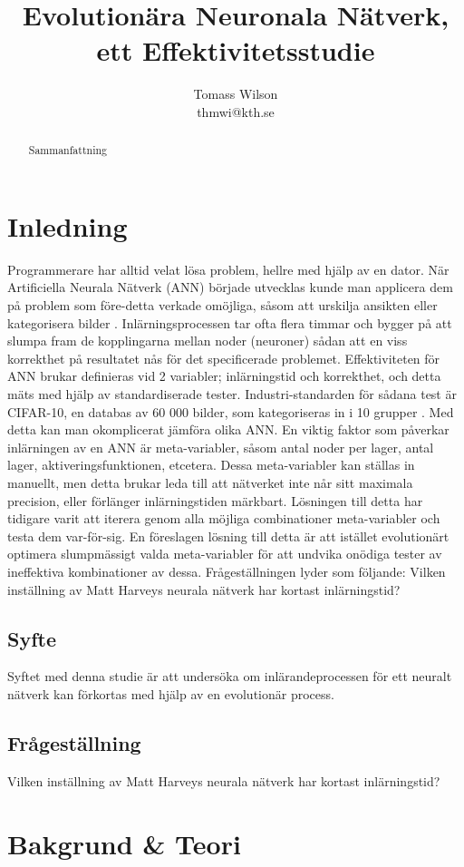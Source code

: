 \documentclass[a4paper, 11pt, twocolumn]{article}
\title{Evolutionära Neuronala Nätverk, ett Effektivitetsstudie}
\author{Tomass Wilson\\thmwi@kth.se}
\begin{document}
  \maketitle

  \begin{abstract}
    Sammanfattning
  \end{abstract}

  \tableofcontents

  \section{Inledning}
    Programmerare har alltid velat lösa problem, hellre med hjälp av en dator. När Artificiella Neurala Nätverk (ANN) började utvecklas kunde man applicera dem på problem som före-detta verkade omöjliga, såsom att urskilja ansikten eller kategorisera bilder \parencite{hopfield1988artificial}. Inlärningsprocessen tar ofta flera timmar och bygger på att slumpa fram de kopplingarna mellan noder (neuroner) sådan att en viss korrekthet på resultatet nås för det specificerade problemet. Effektiviteten för ANN brukar definieras vid 2 variabler; inlärningstid och korrekthet, och detta mäts med hjälp av standardiserade tester. Industri-standarden för sådana test är CIFAR-10, en databas av 60 000 bilder, som kategoriseras in i 10 grupper \parencite{krizhevsky2014cifar}. Med detta kan man okomplicerat jämföra olika ANN. En viktig faktor som påverkar inlärningen av en ANN är meta-variabler, såsom antal noder per lager, antal lager, aktiveringsfunktionen, etcetera. Dessa meta-variabler kan ställas in manuellt, men detta brukar leda till att nätverket inte når sitt maximala precision, eller förlänger inlärningstiden märkbart. Lösningen till detta har tidigare varit att iterera genom alla möjliga combinationer meta-variabler och testa dem var-för-sig. En föreslagen lösning till detta är att istället evolutionärt optimera slumpmässigt valda meta-variabler för att undvika onödiga tester av ineffektiva kombinationer av dessa. Frågeställningen lyder som följande: Vilken inställning av Matt Harveys neurala nätverk har kortast inlärningstid?

  \subsection{Syfte}
  Syftet med denna studie är att undersöka om inlärandeprocessen för ett neuralt nätverk kan förkortas med hjälp av en evolutionär process.

  \subsection{Frågeställning}
  Vilken inställning av Matt Harveys neurala nätverk har kortast inlärningstid?
  \section{Bakgrund & Teori}



\printbibliography
\end{document}
